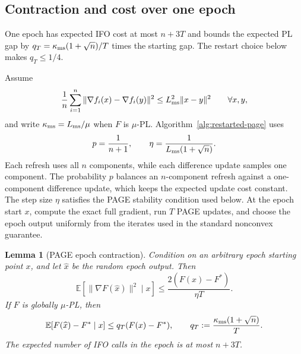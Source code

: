 \documentclass{article}
\newcommand{\E}{\mathbb{E}}
\newtheorem{lemma}[theorem]{Lemma}
\theoremstyle{definition}
\begin{document}
\subsection{Contraction and cost over one epoch}

One epoch has expected IFO cost at most $n+3T$ and bounds the expected PL gap
by $q_T=\kappa_{\rm ms}(1+\sqrt n)/T$ times the starting gap.  The restart
choice below makes $q_T\le1/4$.

Assume
\begin{equation}
 \frac1n\sum_{i=1}^n
 \|\nabla f_i(x)-\nabla f_i(y)\|^2
 \le L_{\rm ms}^2\|x-y\|^2
 \qquad\forall x,y,
 \label{eq:page-ms-premise}
\end{equation}
and write $\kappa_{\rm ms}=L_{\rm ms}/\mu$ when $F$ is $\mu$-PL.
Algorithm~\ref{alg:restarted-page} uses
\begin{equation}
 p=\frac1{n+1},
 \qquad
 \eta=\frac1{L_{\rm ms}(1+\sqrt n)}.
 \label{eq:page-epoch-parameters}
\end{equation}
Each refresh uses all $n$ components, while each difference update samples one
component.
The probability $p$ balances an $n$-component refresh against a one-component
difference update, which keeps the expected update cost constant.  The step
size $\eta$ satisfies the PAGE stability condition used below.
At the epoch start $x$, compute the exact full gradient, run $T$ PAGE
updates, and choose the epoch output uniformly from the iterates used in the
standard nonconvex guarantee.

\begin{lemma}[PAGE epoch contraction]
\label{lem:page-epoch-contraction}
Condition on an arbitrary epoch starting point $x$, and let $\widehat x$ be
the random epoch output.  Then
\begin{equation}
 \E\!\left[\|\nabla F(\widehat x)\|^2\mid x\right]
 \le\frac{2(F(x)-F^*)}{\eta T}.
 \label{eq:page-epoch-gradient}
\end{equation}
If $F$ is globally $\mu$-PL, then
\begin{equation}
 \E\!\left[F(\widehat x)-F^*\mid x\right]
 \le q_T(F(x)-F^*),
 \qquad
 q_T:=\frac{\kappa_{\rm ms}(1+\sqrt n)}{T}.
 \label{eq:page-epoch-gap}
\end{equation}
The expected number of IFO calls in the epoch is at most $n+3T$.
\end{lemma}
\end{document}
